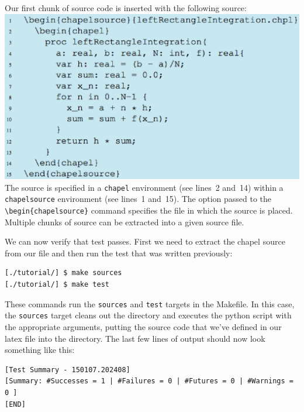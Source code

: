   \begin{seamlessnote}
    Our first chunk of source code is inserted with the following \latex source:\\
    \includegraphics[scale=.6]{fig/s3_listing.eps}\\
    The source is specified in a \verb|chapel| environment (see lines~2 and~14) within 
    a \verb|chapelsource| environment (see lines~1 and~15). The option passed to the
    \verb|\begin{chapelsource}| command specifies the file in which the source is placed.
    Multiple chunks of source can be extracted into a given source file.

    We can now verify that test  passes. First
    we need to extract the chapel source from our \latex file and then run the test that was
    written previously:
  \begin{verbatim}
[./tutorial/] $ make sources
[./tutorial/] $ make test
  \end{verbatim}
  These commands run the \verb|sources| and \verb|test| targets in the Makefile.
  In this case, the \verb|sources| target cleans out the  directory and
  executes the  python script with the appropriate arguments, putting
  the source code that we've defined in our latex file into the  directory.
  The last few lines of output should now look something like this:
  \begin{verbatim}
[Test Summary - 150107.202408]
[Summary: #Successes = 1 | #Failures = 0 | #Futures = 0 | #Warnings = 0 ]
[END]
  \end{verbatim}
\end{seamlessnote}

